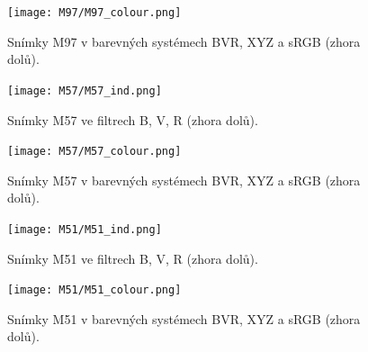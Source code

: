 \documentclass[a4paper,11pt,twocolumn]{article}
\begin{document}
    \begin{figure}
        \centering
        \texttt{[image: M97/M97\_colour.png]}
        \caption{Snímky M97 v barevných systémech BVR, XYZ a sRGB (zhora dolů).}
        \label{fig:M97_colour.png}
    \end{figure}

    \begin{figure}
        \centering
        \texttt{[image: M57/M57\_ind.png]}
        \caption{Snímky M57 ve filtrech B, V, R (zhora dolů).}
        \label{fig:M57_ind.png}
    \end{figure}

    \begin{figure}
        \centering
        \texttt{[image: M57/M57\_colour.png]}
        \caption{Snímky M57 v barevných systémech BVR, XYZ a sRGB (zhora dolů).}
        \label{fig:M57_colour.png}
    \end{figure}

    \begin{figure}
        \centering
        \texttt{[image: M51/M51\_ind.png]}
        \caption{Snímky M51 ve filtrech B, V, R (zhora dolů).}
        \label{fig:M51_ind.png}
    \end{figure}

    \begin{figure}
        \centering
        \texttt{[image: M51/M51\_colour.png]}
        \caption{Snímky M51 v barevných systémech BVR, XYZ a sRGB (zhora dolů).}
        \label{fig:M51_colour.png}
    \end{figure}
\end{document}
